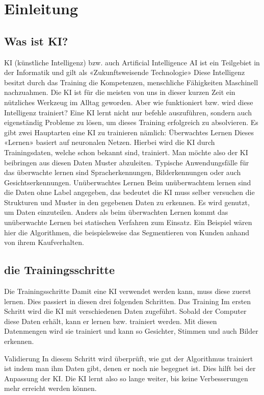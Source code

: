\documentclass{report}
\begin{document}
\tableofcontents
\parindent=0pt
\chapter{Einleitung}
\section{Was ist KI?}

KI (künstliche Intelligenz) bzw. auch Artificial Intelligence AI ist ein Teilgebiet in der Informatik und gilt als «Zukunftsweisende Technologie» Diese Intelligenz besitzt durch das Training die Kompetenzen, menschliche Fähigkeiten Maschinell nachzuahmen. Die KI ist für die meisten von uns in dieser kurzen Zeit ein nützliches Werkzeug im Alltag geworden. Aber wie funktioniert bzw. wird diese Intelligenz trainiert? 
Eine KI lernt nicht nur befehle auszuführen, sondern auch eigenständig Probleme zu lösen, um dieses Training erfolgreich zu absolvieren.
Es gibt zwei Hauptarten eine KI zu trainieren nämlich:  
Überwachtes Lernen
Dieses «Lernen» basiert auf neuronalen Netzen. Hierbei wird die KI durch Trainingsdaten, welche schon bekannt sind, trainiert. Man möchte also der KI beibringen aus diesen Daten Muster abzuleiten.
Typische Anwendungsfälle für das überwachte lernen sind Spracherkennungen, Bilderkennungen oder auch Gesichtserkennungen.
Unüberwachtes Lernen
Beim unüberwachtem lernen sind die Daten ohne Label angegeben, das bedeutet die KI muss selber versuchen die Strukturen und Muster in den gegebenen Daten zu erkennen. 
Es wird genutzt, um Daten einzuteilen. Anders als beim überwachten Lernen kommt das unüberwachte Lernen bei statischen Verfahren zum Einsatz. 
Ein Beispiel wären hier die Algorithmen, die beispielsweise das Segmentieren von Kunden anhand von ihrem Kaufverhalten. 
\section{die Trainingsschritte}
Die Trainingsschritte
Damit eine KI verwendet werden kann, muss diese zuerst lernen. Dies passiert in diesen drei folgenden Schritten.
Das Training
Im ersten Schritt wird die KI mit verschiedenen Daten zugeführt. Sobald der Computer diese Daten erhält, kann er lernen bzw. trainiert werden. Mit diesen Datenmengen wird sie trainiert und kann so Gesichter, Stimmen und auch Bilder erkennen.

Validierung 
In diesem Schritt wird überprüft, wie gut der Algorithmus trainiert ist indem man ihm Daten gibt, denen er noch nie begegnet ist. Dies hilft bei der Anpassung der KI. 
Die KI lernt also so lange weiter, bis keine Verbesserungen mehr erreicht werden können. 
\end{document}
